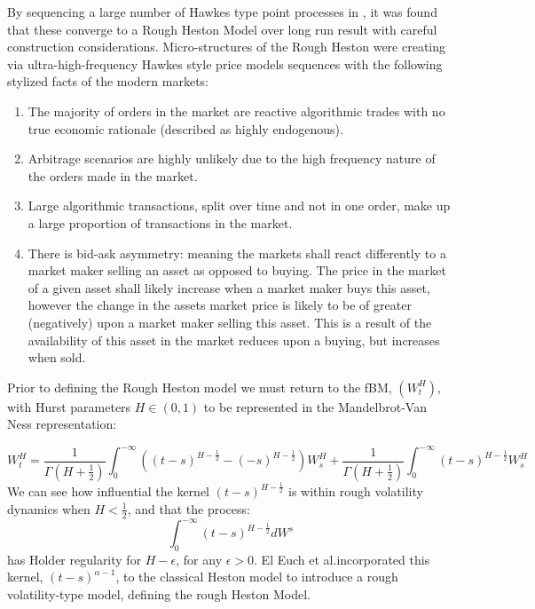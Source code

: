 \documentclass[12pt,oneside]{article}
\begin{document}
By sequencing a large number of Hawkes type point processes in \cite{omar2016microstructural}, it was found that these converge to a Rough Heston Model over long run result with careful construction considerations. Micro-structures of the Rough Heston were creating via  ultra-high-frequency Hawkes style price models sequences with the following stylized facts of the modern markets: 
\begin{enumerate} 
\item The majority of orders in the market are reactive algorithmic trades with no true economic rationale (described as highly endogenous). 
\item Arbitrage scenarios are highly unlikely due to the high frequency nature of the orders made in the market.  
\item Large algorithmic transactions, split over time and not in one order,  make up a large proportion of transactions in the market.
\item There is bid-ask asymmetry: meaning the markets shall react differently to a market maker selling an asset as opposed to buying. The price in the market of a given asset shall likely increase when a market maker buys this asset, however the change in the assets market price is likely to be of greater (negatively) upon a market maker selling this asset. This is a result of the availability of this asset in the market reduces upon a buying, but increases when sold. 
\end{enumerate}

Prior to defining the Rough Heston model we must return to the fBM, $(\textit{$W^H_t$})$, with Hurst parameters $\textit{H} \in (0,1)$ to be represented in the Mandelbrot-Van Ness representation:

\begin{equation}
\label{eqn:MvN_Hurst}
{W^H_t} = \frac{1}{\Gamma(H + \frac{1}{2})} \int_{0}^{-\infty} ((t-s)^{H-\frac{1}{2}} - (-s)^{H - \frac{1}{2}})W^H_s + \frac{1}{\Gamma(H + \frac{1}{2})} \int_{0}^{-\infty} (t-s)^{H-\frac{1}{2}}W^H_s
\end{equation}
We can see how influential  the kernel  $(t-s)^{H-\frac{1}{2}}$ is within rough volatility dynamics when $H<\frac{1}{2}$, and that the process: 
$$\int_{0}^{-\infty} (t-s)^{H-\frac{1}{2}} dW^s$$
has Holder regularity for $H - \epsilon$, for any $\epsilon>0$. El Euch et al.incorporated this kernel, $(t-s)^{\alpha-1}$, to the classical Heston model to introduce a rough volatility-type model, defining the rough Heston Model.
\end{document}
